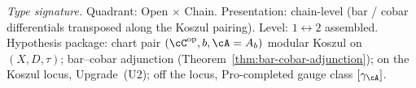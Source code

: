 \begin{theorem}
\label{thm:hdm-matched-pair-canonicity}
\emph{Type signature.} Quadrant: Open $\times$ Chain. Presentation:
chain-level (bar / cobar differentials transposed along the Koszul
pairing). Level: $1\leftrightarrow 2$ assembled. Hypothesis package:
chart pair $(\cC^{\mathrm{op}}, b, \cA = A_b)$ modular Koszul on
$(X, D, \tau)$; bar--cobar adjunction
\textup{(}Theorem~\textup{\ref{thm:bar-cobar-adjunction}}\textup{);}
on the Koszul locus, Upgrade~\textup{(U2)}; off the locus,
$\mathrm{Pro}$-completed gauge class
$[\gamma_\cA]$.


\end{theorem}
